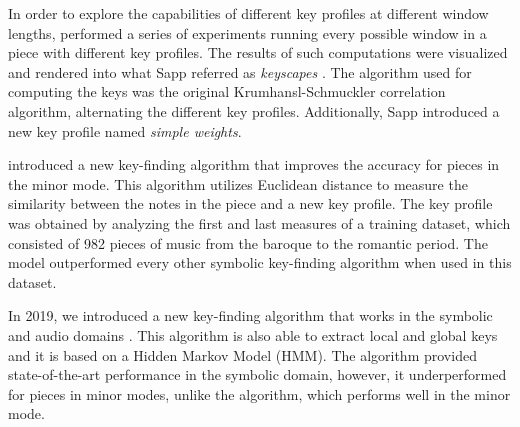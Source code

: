 


In order to explore the capabilities of different key
profiles at different window lengths,
\textcite{sapp2011computational} performed a series of
experiments running every possible window in a piece with
different key profiles. The results of such computations
were visualized and rendered into what Sapp referred as
\emph{keyscapes} \parencite{sapp2001harmonic}. The algorithm
used for computing the keys was the original
Krumhansl-Schmuckler correlation algorithm, alternating the
different key profiles. Additionally, Sapp introduced a new
key profile named \emph{simple weights}.

\textcite{albrecht2013use} introduced a new key-finding
algorithm that improves the accuracy for pieces in the minor
mode. This algorithm utilizes Euclidean distance to measure
the similarity between the notes in the piece and a new key
profile. The key profile was obtained by analyzing the first
and last measures of a training dataset, which consisted of
982 pieces of music from the baroque to the romantic period.
The model outperformed every other symbolic key-finding
algorithm when used in this dataset.




In 2019, we introduced a new key-finding algorithm that
works in the symbolic and audio domains
\parencite{napoleslopez2019keyfinding}. This algorithm is
also able to extract local and global keys and it is based
on a Hidden Markov Model (HMM). The algorithm provided
state-of-the-art performance in the symbolic domain,
however, it underperformed for pieces in minor modes, unlike
the \textcite{albrecht2013use} algorithm, which performs
well in the minor mode.


